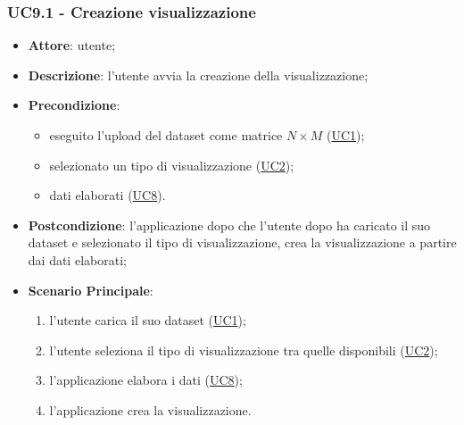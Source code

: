     \subsubsection{UC9.1 - Creazione visualizzazione}
    \label{uc9.1}
    \begin{itemize}
    \item \textbf{Attore}: utente;
    \item \textbf{Descrizione}: l'utente avvia la creazione della visualizzazione;
    \item \textbf{Precondizione}: 
    \begin{itemize}
        \item eseguito l'upload del dataset come matrice $N\times M$ (\hyperref[uc1]{UC1});
        \item selezionato un tipo di visualizzazione (\hyperref[uc2]{UC2});
        \item dati elaborati (\hyperref[uc8]{UC8}).
    \end{itemize}  
    \item \textbf{Postcondizione}: l'applicazione dopo che l'utente dopo ha caricato il suo dataset e selezionato il tipo di visualizzazione, crea la visualizzazione a partire dai dati elaborati;
    \item \textbf{Scenario Principale}: 
    \begin{enumerate}
        \item l'utente carica il suo dataset (\hyperref[uc1]{UC1});
        \item l'utente seleziona il tipo di visualizzazione tra quelle disponibili (\hyperref[uc2]{UC2});
        \item l'applicazione elabora i dati (\hyperref[uc8]{UC8});
        \item l'applicazione crea la visualizzazione.
    \end{enumerate}
    \end{itemize}
    
